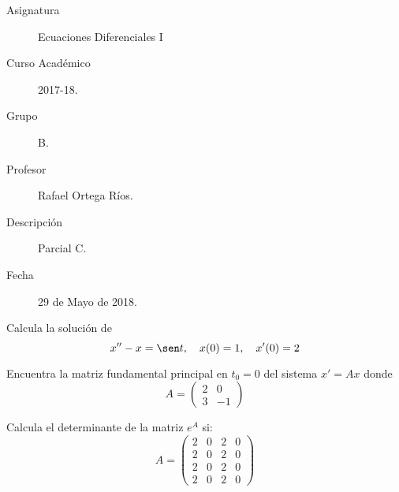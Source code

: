 \documentclass[12pt]{article}
\begin{document}

    
    

    \begin{description}
        \item[Asignatura] Ecuaciones Diferenciales I
        \item[Curso Académico] 2017-18.
        \item[Grupo] B.
        \item[Profesor] Rafael Ortega Ríos.
        \item[Descripción] Parcial C.
        \item[Fecha] 29 de Mayo de 2018.
    \end{description}
    \newpage

    \begin{ejercicio}
        Calcula la solución de 
        \[
            x'' - x = \sen t, \quad x(0) = 1, \quad x'(0) = 2
        \]
    \end{ejercicio}

    \begin{ejercicio}
        Encuentra la matriz fundamental principal en $t_0 = 0$ del sistema $x' = Ax$ donde 
        \[
            A = \begin{pmatrix}
                2 & 0 \\
                3 & -1
            \end{pmatrix}
        \]
    \end{ejercicio}

    \begin{ejercicio}
        Calcula el determinante de la matriz $e^{A}$ si:
        \[
            A = \begin{pmatrix}
                2 & 0 & 2 & 0 \\
                2 & 0 & 2 & 0 \\
                2 & 0 & 2 & 0 \\
                2 & 0 & 2 & 0
            \end{pmatrix}
        \]
    \end{ejercicio}
\end{document}
